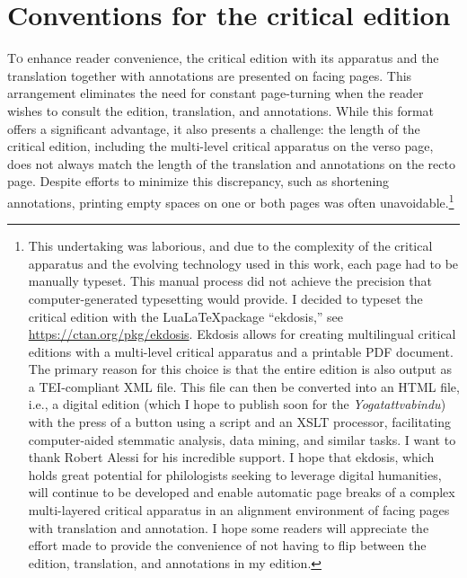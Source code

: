 

\section{Conventions for the critical edition}

\lettrine[lines=2, lhang=0.2, loversize=0.25]{T}{o} enhance reader convenience, the critical edition with its apparatus and the translation together with annotations are presented on facing pages. This arrangement eliminates the need for constant page-turning when the reader wishes to consult the edition, translation, and annotations. While this format offers a significant advantage, it also presents a challenge: the length of the critical edition, including the multi-level critical apparatus on the verso page, does not always match the length of the translation and annotations on the recto page. Despite efforts to minimize this discrepancy, such as shortening annotations, printing empty spaces on one or both pages was often unavoidable.\footnote{This undertaking was laborious, and due to the complexity of the critical apparatus and the evolving technology used in this work, each page had to be manually typeset. This manual process did not achieve the precision that computer-generated typesetting would provide. I decided to typeset the critical edition with the Lua\LaTeX package ``ekdosis,'' see \url{https://ctan.org/pkg/ekdosis}. Ekdosis allows for creating multilingual critical editions with a multi-level critical apparatus and a printable PDF document. The primary reason for this choice is that the entire edition is also output as a TEI-compliant XML file. This file can then be converted into an HTML file, i.e., a digital edition (which I hope to publish soon for the \emph{Yogatattvabindu}) with the press of a button using a script and an XSLT processor, facilitating computer-aided stemmatic analysis, data mining, and similar tasks. I want to thank Robert Alessi for his incredible support. I hope that ekdosis, which holds great potential for philologists seeking to leverage digital humanities, will continue to be developed and enable automatic page breaks of a complex multi-layered critical apparatus in an alignment environment of facing pages with translation and annotation. I hope some readers will appreciate the effort made to provide the convenience of not having to flip between the edition, translation, and annotations in my edition.}

